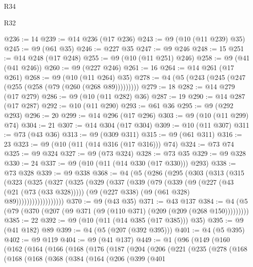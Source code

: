 \begin{lexlean}{R34}
\begin{lexlean}{R32}
\begin{coremodule}
{{{{{{{{{{{{{{{{{{{{{{{{{{{{{{{{{{{{{{{{{{{{{{{{{{{@236 := 14
@239 := @14 @236 (@17 @236)
@243 := @9 (@10 (@11 @239) @35)
@245 := @9 (@61 @35)
@246 := @227 @35
@247 := @9 @246
@248 := 15
@251 := @14 @248 (@17 @248)
@255 := @9 (@10 (@11 @251) @246)
@258 := @9 (@41 (@41 @246))
@260 := @9 (@227 @246)
@261 := 16
@264 := @14 @261 (@17 @261)
@268 := @9 (@10 (@11 @264) @35)
@278 := @4 (@5 (@243 (@245 (@247 (@255 (@258 (@79 (@260 (@268 @89)))))))))
@279 := 18
@282 := @14 @279 (@17 @279)
@286 := @9 (@10 (@11 @282) @36)
@287 := 19
@290 := @14 @287 (@17 @287)
@292 := @10 (@11 @290)
@293 := @61 @36
@295 := @9 (@292 @293)
@296 := 20
@299 := @14 @296 (@17 @296)
@303 := @9 (@10 (@11 @299) @74)
@304 := 21
@307 := @14 @304 (@17 @304)
@309 := @10 (@11 @307)
@311 := @73 (@43 @36)
@313 := @9 (@309 @311)
@315 := @9 (@61 @311)
@316 := 23
@323 := @9 (@10 (@11 (@14 @316 (@17 @316))) @74)
@324 := @73 @74
@325 := @9 @324
@327 := @9 (@73 @324)
@328 := @73 @35
@329 := @9 @328
@330 := 24
@337 := @9 (@10 (@11 (@14 @330 (@17 @330))) @293)
@338 := @73 @328
@339 := @9 @338
@368 := @4
    (@5
      (@286
        (@295
          (@303
            (@313
              (@315
                (@323
                  (@325
                    (@327
                      (@325
                        (@329
                          (@337
                            (@339
                              (@79
                                (@339
                                  (@9
                                    (@227 (@43 (@21 (@73 (@33 @328)))))
                                    (@9 (@227 @338) (@9 (@61 @328) @89))))))))))))))))))
@370 := @9 (@43 @35)
@371 := @43 @137
@384 := @4 (@5 (@79 (@370 (@207 (@9 @371 (@9 (@110 @371) (@209 (@209 (@268 @150)))))))))
@385 := 22
@392 := @9 (@10 (@11 (@14 @385 (@17 @385))) @35)
@395 := @9 (@41 @182) @89
@399 := @4 (@5 (@207 (@392 @395)))
@401 := @4 (@5 @395)
@402 := @9 @119
@404 := @9 (@41 @137)
@449 := @1
    (@96
      (@149
        (@160
          (@162
            (@164
              (@166
                (@168
                  (@176
                    (@187
                      (@204
                        (@206
                          (@221
                            (@235
                              (@278
                                (@168
                                  (@168
                                    (@168
                                      (@368
                                        (@384
                                          (@164
                                            (@206
                                              (@399
                                                (@401
}}}}}}}}}}}}}}}}}}}}}}}}}}}}}}}}}}}}}}}}}}}}}}}}}}}
\end{coremodule}
\end{lexlean}
\end{lexlean}
